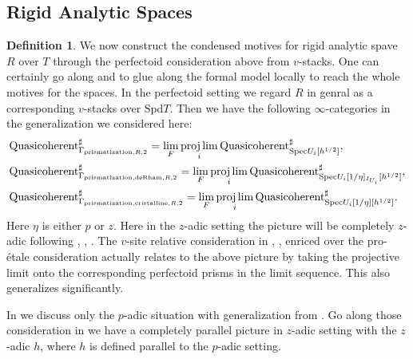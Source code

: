 \documentclass[12pt]{article}
\theoremstyle{definition}
\newtheorem{definition}{Definition}
\begin{document}
\subsection{Rigid Analytic Spaces}


\begin{definition}
We now construct the condensed motives for rigid analytic spave $R$ over $T$ through the perfectoid consideration above from $v$-stacks. One can certainly go along \cite{SchI} and \cite{ALBRCS} to glue along the formal model locally to reach the whole motives for the spaces. In the perfectoid setting we regard $R$ in genral as a corresponding $v$-stacks over $\mathrm{Spd}T$. Then we have the following $\infty$-categories in the generalization we considered here:
\begin{align}
&\mathrm{Quasicoherent}^\sharp_{\mathrm{\Gamma}_{\mathrm{prismatization},R,2}}=\lim_{F}\projlim_i \mathrm{Quasicoherent}^\sharp_{\mathrm{Spec}U_i[h^{1/2}]},\\
&\mathrm{Quasicoherent}^\sharp_{\mathrm{\Gamma}_{\mathrm{prismatization},\mathrm{deRham},R,2}}=\lim_{F}\projlim_i \mathrm{Quasicoherent}^\sharp_{\mathrm{Spec}U_i[1/\eta]_{I_{U_i}}[h^{1/2}]},\\
&\mathrm{Quasicoherent}^\sharp_{\mathrm{\Gamma}_{\mathrm{prismatization},\mathrm{cristalline},R,2}}=\lim_{F}\projlim_i \mathrm{Quasicoherent}^\sharp_{\mathrm{Spec}U_i[1/\eta][h^{1/2}]}.
\end{align}
Here $\eta$ is either $p$ or $z$. Here in the $z$-adic setting the picture will be completely $z$-adic following \cite{SchIV}, \cite{KLI}, \cite{KLII}. The $v$-site relative consideration in \cite{SchIV}, \cite{KLI}, \cite{KLII} enriced over the pro-\'etale consideration actually relates to the above picture by taking the projective limit onto the corresponding perfectoid prisms in the limit sequence. This also generalizes \cite{TIV} significantly. 
\end{definition}

In \cite{TIV} we discuss only the $p$-adic situation with generalization from \cite{BSB}. Go along those consideration in \cite{TIV} we have a completely parallel picture in $z$-adic setting with the $z$-adic $h$, where $h$ is defined parallel to the $p$-adic setting. 
\end{document}
